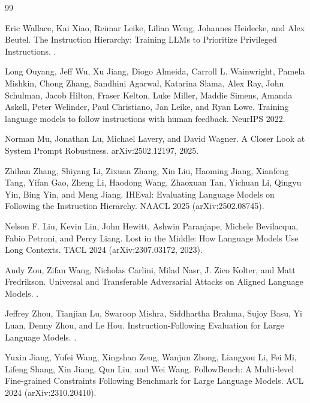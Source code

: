 \documentclass{article}
\begin{document}

\begin{thebibliography}{99}

Eric Wallace, Kai Xiao, Reimar Leike, Lilian Weng, Johannes Heidecke, and Alex Beutel.
\newblock The Instruction Hierarchy: Training LLMs to Prioritize Privileged Instructions.
.

Long Ouyang, Jeff Wu, Xu Jiang, Diogo Almeida, Carroll L. Wainwright, Pamela Mishkin, Chong Zhang, Sandhini Agarwal, Katarina Slama, Alex Ray, John Schulman, Jacob Hilton, Fraser Kelton, Luke Miller, Maddie Simens, Amanda Askell, Peter Welinder, Paul Christiano, Jan Leike, and Ryan Lowe.
\newblock Training language models to follow instructions with human feedback.
\newblock NeurIPS 2022.

Norman Mu, Jonathan Lu, Michael Lavery, and David Wagner.
\newblock A Closer Look at System Prompt Robustness.
\newblock arXiv:2502.12197, 2025.

Zhihan Zhang, Shiyang Li, Zixuan Zhang, Xin Liu, Haoming Jiang, Xianfeng Tang, Yifan Gao, Zheng Li, Haodong Wang, Zhaoxuan Tan, Yichuan Li, Qingyu Yin, Bing Yin, and Meng Jiang.
\newblock IHEval: Evaluating Language Models on Following the Instruction Hierarchy.
\newblock NAACL 2025 (arXiv:2502.08745).

Nelson F. Liu, Kevin Lin, John Hewitt, Ashwin Paranjape, Michele Bevilacqua, Fabio Petroni, and Percy Liang.
\newblock Lost in the Middle: How Language Models Use Long Contexts.
\newblock TACL 2024 (arXiv:2307.03172, 2023).

Andy Zou, Zifan Wang, Nicholas Carlini, Milad Nasr, J. Zico Kolter, and Matt Fredrikson.
\newblock Universal and Transferable Adversarial Attacks on Aligned Language Models.
.

Jeffrey Zhou, Tianjian Lu, Swaroop Mishra, Siddhartha Brahma, Sujoy Basu, Yi Luan, Denny Zhou, and Le Hou.
\newblock Instruction-Following Evaluation for Large Language Models.
.

Yuxin Jiang, Yufei Wang, Xingshan Zeng, Wanjun Zhong, Liangyou Li, Fei Mi, Lifeng Shang, Xin Jiang, Qun Liu, and Wei Wang.
\newblock FollowBench: A Multi-level Fine-grained Constraints Following Benchmark for Large Language Models.
\newblock ACL 2024 (arXiv:2310.20410).


\end{thebibliography}
\end{document}
